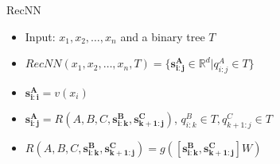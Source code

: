 \documentclass[usenames,dvipsnames,handout,aspectratio=169]{beamer}
\begin{document}
\begin{frame}{RecNN}
\begin{itemize}
\item Input: $x_1, x_2, \ldots, x_n$ and a binary tree $T$

\item $RecNN(x_1, x_2, \ldots, x_n, T) = \{ \bm{s_{i:j}^A} \in \mathbb{R}^d | q_{i:j}^A \in  T \} $
\item $\bm{s_{i:i}^A} = v(x_i)$
\item $\bm{s_{i:j}^A} = R(A,B,C, \bm{s_{i:k}^B}, \bm{s_{k+1:j}^C})$, $q_{i:k}^B \in T, q_{k+1:j}^C \in T$
\item $R(A,B,C, \bm{s_{i:k}^B}, \bm{s_{k+1:j}^C}) = g([\bm{s_{i:k}^B}, \bm{s_{k+1:j}^C}]W)$	
\end{itemize}
\end{frame}
\end{document}
